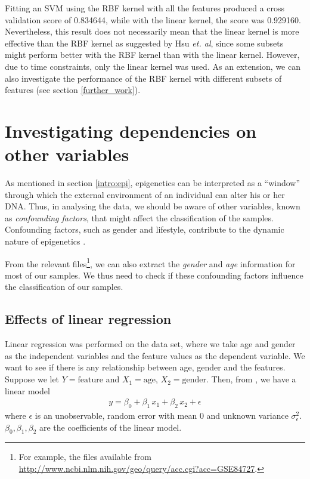 \documentclass[12pt, twoside, a4paper]{report}
\begin{document}

Fitting an SVM using the RBF kernel with all the features produced a cross validation score of 0.834644, while with the linear kernel, the score was 0.929160. Nevertheless, this result does not necessarily mean that the linear kernel is more effective than the RBF kernel as suggested by Hsu \textit{et. al}, since some subsets might perform better with the RBF kernel than with the linear kernel. However, due to time constraints, only the linear kernel was used. As an extension, we can also investigate the performance of the RBF kernel with different subsets of features (see section \ref{further_work}).

\section{Investigating dependencies on other variables}

As mentioned in section \ref{intro:epi}, epigenetics can be interpreted as a ``window'' through which the external environment of an individual can alter his or her DNA. Thus, in analysing the data, we should be aware of other variables, known as \textit{confounding factors}, that might affect the classification of the samples. Confounding factors, such as gender and lifestyle, contribute to the dynamic nature of epigenetics \cite{RefWorks:78}.

From the relevant files\footnote{For example, the files available from \url{http://www.ncbi.nlm.nih.gov/geo/query/acc.cgi?acc=GSE84727}.}, we can also extract the \textit{gender} and \textit{age} information for most of our samples. We thus need to check if these confounding factors influence the classification of our samples.

\subsection{Effects of linear regression}
Linear regression was performed on the data set, where we take age and gender as the independent variables and the feature values as the dependent variable. We want to see if there is any relationship between age, gender and the features. Suppose we let $Y=\text{feature}$ and $X_1=\text{age}$, $X_2=\text{gender}$. Then, from \cite{RefWorks:219}, we have a linear model
\begin{align*}
y = \beta_0 + \beta_1 \, x_1 + \beta_2 \, x_2 + \epsilon
\end{align*}
where $\epsilon$ is an unobservable, random error with mean 0 and unknown variance $\sigma_\epsilon^2$. $\beta_0, \beta_1, \beta_2$ are the coefficients of the linear model.
\end{document}
